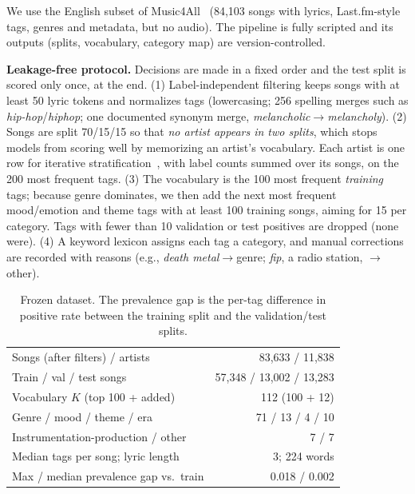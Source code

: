 \documentclass{article}
\begin{document}
We use the English subset of Music4All~\cite{santana2020music4all} (84,103 songs with lyrics, Last.fm-style tags, genres and metadata, but no audio). The pipeline is fully scripted and its outputs (splits, vocabulary, category map) are version-controlled.

\textbf{Leakage-free protocol.} Decisions are made in a fixed order and the test split is scored only once, at the end. (1) Label-independent filtering keeps songs with at least 50 lyric tokens and normalizes tags (lowercasing; 256 spelling merges such as \emph{hip-hop}/\emph{hiphop}; one documented synonym merge, \emph{melancholic}$\to$\emph{melancholy}). (2) Songs are split 70/15/15 so that \emph{no artist appears in two splits}, which stops models from scoring well by memorizing an artist's vocabulary. Each artist is one row for iterative stratification~\cite{sechidis2011stratification}, with label counts summed over its songs, on the 200 most frequent tags. (3) The vocabulary is the 100 most frequent \emph{training} tags; because genre dominates, we then add the next most frequent mood/emotion and theme tags with at least 100 training songs, aiming for 15 per category. Tags with fewer than 10 validation or test positives are dropped (none were). (4) A keyword lexicon assigns each tag a category, and manual corrections are recorded with reasons (e.g., \emph{death metal}$\to$genre; \emph{fip}, a radio station, $\to$other).

\begin{table}[t]
\centering\small
\begin{tabular}{@{}lr@{}}
\toprule
Songs (after filters) / artists & 83,633 / 11,838 \\
Train / val / test songs & 57,348 / 13,002 / 13,283 \\
Vocabulary $K$ (top 100 + added) & 112 (100 + 12) \\
Genre / mood / theme / era & 71 / 13 / 4 / 10 \\
Instrumentation-production / other & 7 / 7 \\
Median tags per song; lyric length & 3; 224 words \\
Max / median prevalence gap vs.\ train & 0.018 / 0.002 \\
\bottomrule
\end{tabular}
\caption{Frozen dataset. The prevalence gap is the per-tag difference in positive rate between the training split and the validation/test splits.}
\label{tab:data}
\end{table}
\end{document}
